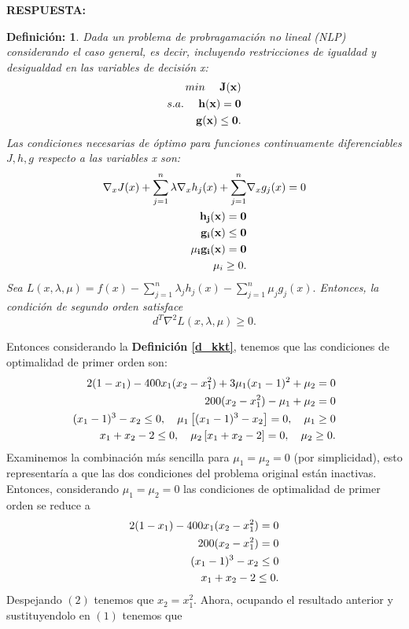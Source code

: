 \documentclass[11pt,letterpaper]{article}
\newcommand{\res}{\textbf{RESPUESTA:}\\}
\newcommand{\sumj}{\sum_{j=1}^n}
\newtheorem{thmd}{Definición:}
\begin{document}
\begin{enumerate}
\begin{itemize}
\res 
\begin{framed}\label{d_kkt}
    \begin{thmd} Dada un problema de probragamación no lineal (NLP) considerando el caso general, es decir, incluyendo restricciones de igualdad y desigualdad en las variables de decisión x: 
    \begin{align*}
    min \ \ \ \ \bf J(x)\\
    s.a. \ \ \ \ \bf h(x)=0\\
	\bf g(x)\leq 0.    
    \end{align*} 
Las condiciones necesarias de óptimo para funciones continuamente diferenciables $J, h, g$ respecto a las variables x son:
\begin{align*}\centering
\nabla_x J(x)+\sumj \lambda \nabla_x h_j(x)+\sumj &\nabla_x g_j(x)=0\\
\bf h_j(x)=0\\
\bf g_i(x)\leq 0\\
\bf \mu_i g_i(x)=0\\
\mu_i\geq 0.
\end{align*}
	Sea $L(x,\lambda, \mu)=f(x)-\sumj\lambda_j h_j(x)-\sumj \mu_jg_j(x).$ Entonces, la condición de segundo orden satisface $$d^T\nabla^2 L(x,\lambda, \mu)\geq 0.$$
    \end{thmd}
\end{framed}
Entonces considerando la \textbf{Definición \ref{d_kkt}}, tenemos que las condiciones de optimalidad de primer orden son:
\begin{align*}\centering
2(1-x_1)-400x_1(x_2-x_1^2)+3\mu_1(x_1-1)^2+\mu_2=0&\\
200(x_2-x_1^2)-\mu_1+\mu_2=0&\\
(x_1-1)^3-x_2\leq 0,\ \ \ \mu_1\left[(x_1-1)^3-x_2\right] =0, \  \ \ \mu_1\geq 0\\
x_1+x_2-2\leq 0, \ \ \ \mu_2\left[x_1+x_2-2\right]=0,\ \ \ \mu_2\geq 0.
\end{align*}
Examinemos la combinación más sencilla para $\mu_1=\mu_2=0$ (por simplicidad), esto representaría a que las dos condiciones del problema original están inactivas. Entonces, considerando $\mu_1=\mu_2=0$ las condiciones de optimalidad de primer orden se reduce a 
\begin{align}\centering
2(1-x_1)-400x_1(x_2-x_1^2)=0&\\
200(x_2-x_1^2)=0&\\
(x_1-1)^3-x_2\leq 0\\
x_1+x_2-2\leq 0.
\end{align}
Despejando $(2)$ tenemos que $x_2=x_1^2$. Ahora, ocupando el resultado anterior y sustituyendolo en $(1)$ tenemos que

\end{itemize}
\end{enumerate}
\end{document}
